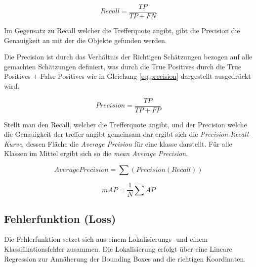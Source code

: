 \begin{equation}
  \label{eq:recall}
  Recall = \frac{TP}{TP + FN}
\end{equation}

\vspace{0.5cm}

Im Gegensatz zu Recall welcher die Trefferquote angibt, 
gibt die Precision die Genauigkeit an mit der die Objekte
gefunden werden.

Die Precision ist durch das Verhältnis der Richtigen 
Schätzungen bezogen auf alle gemachten Schätzungen definiert, 
was durch die True Positives durch die True Positives + 
False Positives wie in Gleichung \ref{eq:precision}
dargestellt ausgedrückt wird.


\begin{equation}
  \label{eq:precision}
  Precision = \frac{TP}{TP + FP}
\end{equation}

\vspace{0.5cm}

Stellt man den Recall, welcher die Trefferquote angibt, und der 
Precision welche die Genauigkeit der treffer angibt gemeinsam 
dar ergibt sich die \textit{Precision-Recall-Kurve}, dessen 
Fläche die \textit{Average Prcision} für eine klasse darstellt.
Für alle Klassen im Mittel ergibt sich so die \textit{mean Average 
Precision}.

\vspace{0.5cm}

\begin{equation}
  Average Precision = \sum(Precision(Recall))
\end{equation}

\begin{equation}
  mAP = \frac{1}{N} \sum AP
\end{equation}

\vspace{0.5cm}





\subsection*{Fehlerfunktion (Loss)}
Die Fehlerfunktion setzet sich aus einem Lokalisierungs- und einem 
Klassifikationsfehler zusammen. 
Die Lokalisierung erfolgt über eine Lineare Regression zur 
Annäherung der Bounding Boxes and die richtigen Koordinaten.



